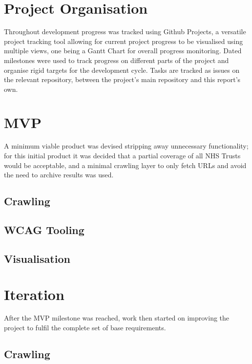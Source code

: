 \pagebreak

\section{Project Organisation}
Throughout development progress was tracked using Github Projects, a versatile project tracking tool allowing for current project progress to be visualised using multiple views, one being a Gantt Chart for overall progress monitoring. Dated milestones were used to track progress on different parts of the project and organise rigid targets for the development cycle. Tasks are tracked as issues on the relevant repository, between the project's main repository and this report's own.

\section{MVP}
A minimum viable product was devised stripping away unnecessary functionality; for this initial product it was decided that a partial coverage of all NHS Trusts would be acceptable, and a minimal crawling layer to only fetch URLs and avoid the need to archive results was used.

\subsection{Crawling}

\subsection{WCAG Tooling}


\subsection{Visualisation}

\section{Iteration}
After the MVP milestone was reached, work then started on improving the project to fulfil the complete set of base requirements.

\subsection{Crawling}

